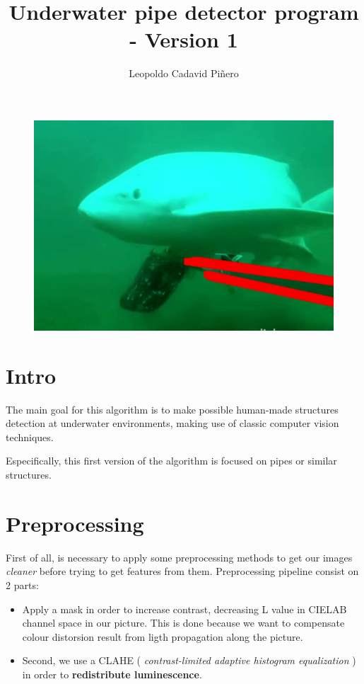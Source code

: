\documentclass[12pt, a4paper]{article}
\title{Underwater pipe detector program   - Version 1}
\author{
Leopoldo Cadavid Piñero
}
\begin{document}
\maketitle

\begin{figure}[H]
    \centering
    \includegraphics[scale=0.5]{images_doc/titel.png}
    
    \label{fig:repre}
\end{figure}

\newpage
\tableofcontents
\newpage

      
\section{Intro}

The main goal for this algorithm is to make possible human-made structures detection at underwater environments, making use of 
classic computer vision techniques.

Especifically, this first version of the algorithm is focused on pipes or similar structures. 

\section{Preprocessing}\label{ch:preprocesamiento}

First of all, is necessary to apply some preprocessing methods to get our images 
\textit{cleaner} before trying to get features from them. Preprocessing pipeline 
consist on 2 parts:

\begin{itemize}
    
    \item Apply a mask in order to increase contrast, decreasing L value in CIELAB channel space in our picture.
    This is done because we want to
    compensate colour distorsion result from ligth propagation along the picture. 
        

    \item Second, we use a CLAHE ( \textit{contrast-limited adaptive histogram equalization} ) in order to 
    \textbf{redistribute luminescence}.
    
    

\end{itemize}
\end{document}
